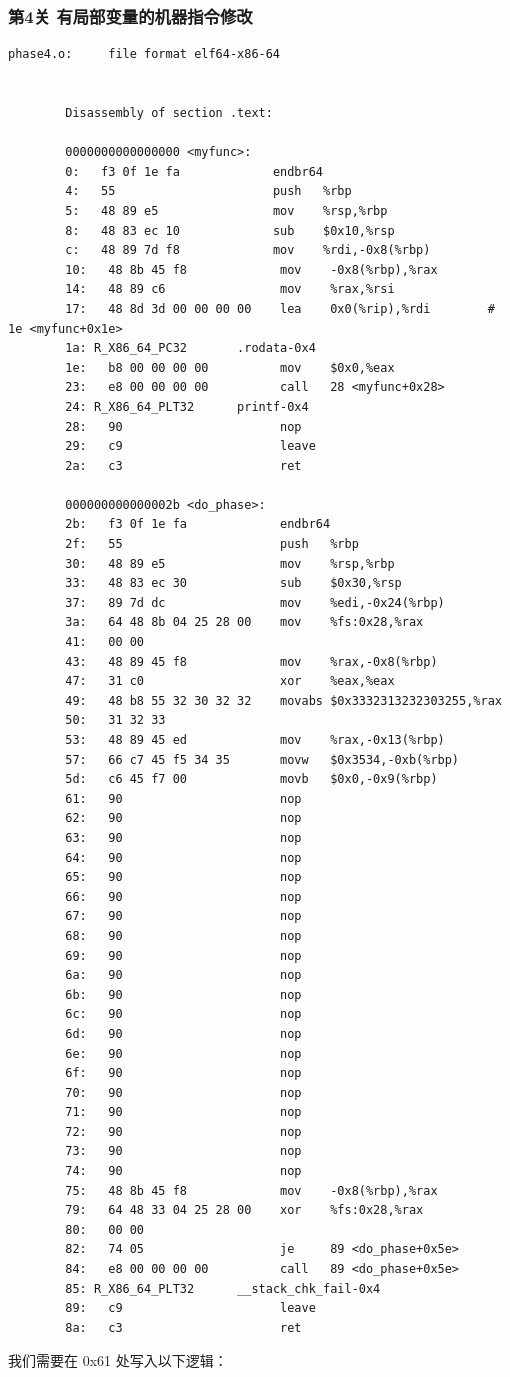 \documentclass[supercite]{Experimental_Report}
\theoremstyle{definition}
\begin{document}
	\subsubsection{第4关 有局部变量的机器指令修改}
	
	\begin{lstlisting}[style=commonCodeStyle, caption={phase4}, label={lst:5-2}]
		phase4.o:     file format elf64-x86-64
		
		
		Disassembly of section .text:
		
		0000000000000000 <myfunc>:
		0:   f3 0f 1e fa             endbr64
		4:   55                      push   %rbp
		5:   48 89 e5                mov    %rsp,%rbp
		8:   48 83 ec 10             sub    $0x10,%rsp
		c:   48 89 7d f8             mov    %rdi,-0x8(%rbp)
		10:   48 8b 45 f8             mov    -0x8(%rbp),%rax
		14:   48 89 c6                mov    %rax,%rsi
		17:   48 8d 3d 00 00 00 00    lea    0x0(%rip),%rdi        # 1e <myfunc+0x1e>
		1a: R_X86_64_PC32       .rodata-0x4
		1e:   b8 00 00 00 00          mov    $0x0,%eax
		23:   e8 00 00 00 00          call   28 <myfunc+0x28>
		24: R_X86_64_PLT32      printf-0x4
		28:   90                      nop
		29:   c9                      leave
		2a:   c3                      ret
		
		000000000000002b <do_phase>:
		2b:   f3 0f 1e fa             endbr64
		2f:   55                      push   %rbp
		30:   48 89 e5                mov    %rsp,%rbp
		33:   48 83 ec 30             sub    $0x30,%rsp
		37:   89 7d dc                mov    %edi,-0x24(%rbp)
		3a:   64 48 8b 04 25 28 00    mov    %fs:0x28,%rax
		41:   00 00 
		43:   48 89 45 f8             mov    %rax,-0x8(%rbp)
		47:   31 c0                   xor    %eax,%eax
		49:   48 b8 55 32 30 32 32    movabs $0x3332313232303255,%rax
		50:   31 32 33 
		53:   48 89 45 ed             mov    %rax,-0x13(%rbp)
		57:   66 c7 45 f5 34 35       movw   $0x3534,-0xb(%rbp)
		5d:   c6 45 f7 00             movb   $0x0,-0x9(%rbp)
		61:   90                      nop
		62:   90                      nop
		63:   90                      nop
		64:   90                      nop
		65:   90                      nop
		66:   90                      nop
		67:   90                      nop
		68:   90                      nop
		69:   90                      nop
		6a:   90                      nop
		6b:   90                      nop
		6c:   90                      nop
		6d:   90                      nop
		6e:   90                      nop
		6f:   90                      nop
		70:   90                      nop
		71:   90                      nop
		72:   90                      nop
		73:   90                      nop
		74:   90                      nop
		75:   48 8b 45 f8             mov    -0x8(%rbp),%rax
		79:   64 48 33 04 25 28 00    xor    %fs:0x28,%rax
		80:   00 00 
		82:   74 05                   je     89 <do_phase+0x5e>
		84:   e8 00 00 00 00          call   89 <do_phase+0x5e>
		85: R_X86_64_PLT32      __stack_chk_fail-0x4
		89:   c9                      leave
		8a:   c3                      ret
	\end{lstlisting}
	我们需要在 0x61 处写入以下逻辑：
	
\end{document}
